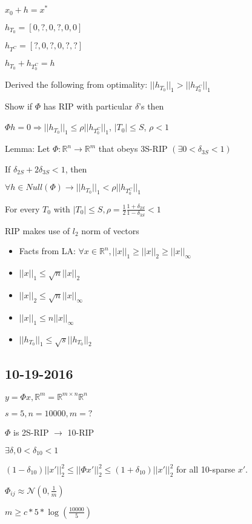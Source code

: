 \documentclass[12pt,letterpaper]{report}
\begin{document}
$x_0 + h = x^*$

$h_{T_0} = [0, ?, 0, ?, 0, 0]$

$h_{T^C} = [?, 0, ?, 0, ?, ?]$

$h_{T_0} + h_{T_0^C} = h$

Derived the following from optimality: $||h_{T_0}||_1 > ||h_{T_0^C}||_1$

Show if $\Phi$ has RIP with particular $\delta$'s then

$\Phi h = 0 \Rightarrow ||h_{T_0}||_1 \leq \rho ||h_{T_0^C}||_1$, $|T_0| \leq S$, $\rho < 1$


Lemma: Let $\Phi : \mathbb{R}^n \rightarrow \mathbb{R}^m$ that obeys 3S-RIP $(\exists 0 < \delta_{3S} < 1)$

If $\delta_{2S} + 2 \delta_{3S} < 1$, then

$\forall h \in Null(\Phi) \rightarrow ||h_{T_0}||_1 < \rho ||h_{T_0^C}||_1$

For every $T_0$ with $|T_0| \leq S, \rho = \frac{1}{2} \frac{1 + \delta_{2S}}{1 -\delta_{3S}} < 1$

RIP makes use of $l_2$ norm of vectors

\begin{itemize}
\item Facts from LA: $\forall x \in \mathbb{R}^n, ||x||_1 \geq ||x||_2 \geq ||x||_\infty$
\item $||x||_1 \leq \sqrt{n} ||x||_2$
\item $||x||_2 \leq \sqrt{n} ||x||_\infty$
\item $||x||_1 \leq n ||x||_\infty$
\item $||h_{T_0}||_1 \leq \sqrt{s} ||h_{T_0}||_2$
\end{itemize}

\subsection*{10-19-2016}

$y = \Phi x, \mathbb{R}^m = \mathbb{R}^{m \times n} \mathbb{R}^n$

$s = 5, n = 10000, m = ?$

$\Phi$ is 2S-RIP $\rightarrow$ 10-RIP

$\exists \delta, 0 < \delta_{10} < 1$

$(1-\delta_{10})||x'||_2^2 \leq ||\Phi x'||_2^2 \leq (1+\delta_{10})||x'||_2^2$ for all 10-sparse $x'$.

$\Phi_{ij} \approx \mathcal{N}(0, \frac{1}{m})$

$m \geq c * 5 * \log(\frac{10000}{5})$
\end{document}
